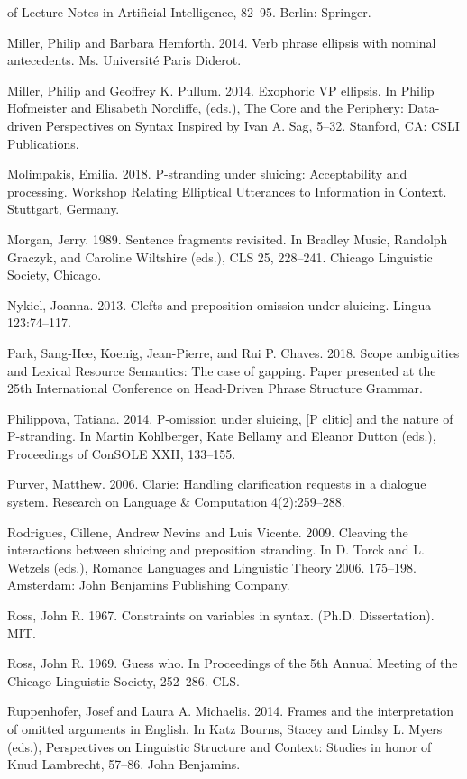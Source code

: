 \documentclass[output=paper]{langsci/langscibook}
\begin{document}
\begin{description}
of Lecture Notes in Artificial Intelligence, 82--95. Berlin: Springer.
\item Miller, Philip and Barbara Hemforth. 2014. Verb phrase ellipsis with nominal antecedents.
Ms. Universit\'{e} Paris Diderot.
\item Miller, Philip and Geoffrey K. Pullum. 2014. Exophoric VP ellipsis. In Philip Hofmeister and
Elisabeth Norcliffe, (eds.), The Core and the Periphery: Data-driven Perspectives on Syntax Inspired by Ivan A. Sag, 5--32. Stanford, CA: CSLI Publications.
\item Molimpakis, Emilia. 2018. P-stranding under sluicing: Acceptability and processing. Workshop Relating Elliptical Utterances to Information in Context. Stuttgart, Germany.
\item Morgan, Jerry. 1989. Sentence fragments revisited. In Bradley Music, Randolph Graczyk, and Caroline Wiltshire (eds.), CLS 25, 228--241. Chicago Linguistic Society, Chicago.
\item Nykiel, Joanna. 2013. Clefts and preposition omission under sluicing. Lingua 123:74--117.
\item Park, Sang-Hee, Koenig, Jean-Pierre, and Rui P. Chaves. 2018. Scope ambiguities and Lexical Resource Semantics: The case of gapping. Paper presented at the 25th International Conference on Head-Driven Phrase Structure Grammar.
\item Philippova, Tatiana. 2014. P-omission under sluicing, [P clitic] and the nature of P-stranding. In Martin Kohlberger, Kate Bellamy and Eleanor Dutton (eds.), Proceedings of ConSOLE XXII, 133--155.
\item Purver, Matthew. 2006. Clarie: Handling clarification requests in a dialogue system. Research
on Language \& Computation 4(2):259--288.
\item Rodrigues, Cillene, Andrew Nevins and Luis Vicente. 2009. Cleaving the interactions between sluicing and preposition stranding. In D. Torck and L. Wetzels (eds.), Romance Languages and Linguistic Theory 2006. 175--198. Amsterdam: John Benjamins Publishing Company.
\item Ross, John R. 1967. Constraints on variables in syntax. (Ph.D. Dissertation). MIT.
\item Ross, John R. 1969. Guess who. In Proceedings of the 5th Annual Meeting of the Chicago
Linguistic Society, 252--286. CLS.
\item Ruppenhofer, Josef  and Laura A. Michaelis. 2014. Frames and the interpretation of omitted arguments in English.
In Katz Bourns, Stacey and Lindsy L. Myers (eds.), Perspectives on Linguistic Structure and Context: Studies in honor of Knud Lambrecht, 57--86. John Benjamins.

\end{description}
\end{document}
